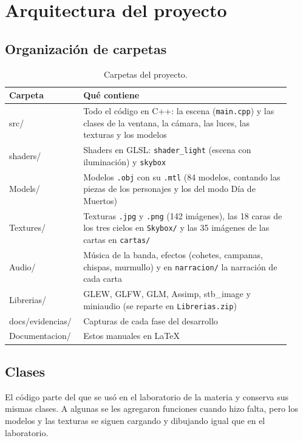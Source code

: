 \documentclass[11pt,a4paper]{article}
\begin{document}
\section{Arquitectura del proyecto}

\subsection{Organización de carpetas}

\begin{table}[H]
  \centering
  \small
  \begin{tabular}{|>{\ttfamily}p{0.22\linewidth}|p{0.7\linewidth}|}
    \hline
    \textbf{Carpeta} & \textbf{Qué contiene} \\ \hline
    src/ & Todo el código en C++: la escena (\texttt{main.cpp}) y las clases de la ventana, la cámara, las luces, las texturas y los modelos \\ \hline
    shaders/ & Shaders en GLSL: \texttt{shader\_light} (escena con iluminación) y \texttt{skybox} \\ \hline
    Models/ & Modelos \texttt{.obj} con su \texttt{.mtl} (84 modelos, contando las piezas de los personajes y los del modo Día de Muertos) \\ \hline
    Textures/ & Texturas \texttt{.jpg} y \texttt{.png} (142 imágenes), las 18 caras de los tres cielos en \texttt{Skybox/} y las 35 imágenes de las cartas en \texttt{cartas/} \\ \hline
    Audio/ & Música de la banda, efectos (cohetes, campanas, chispas, murmullo) y en \texttt{narracion/} la narración de cada carta \\ \hline
    Librerias/ & GLEW, GLFW, GLM, Assimp, stb\_image y miniaudio (se reparte en \texttt{Librerias.zip}) \\ \hline
    docs/evidencias/ & Capturas de cada fase del desarrollo \\ \hline
    Documentacion/ & Estos manuales en LaTeX \\ \hline
  \end{tabular}
  \caption{Carpetas del proyecto.}
\end{table}

\subsection{Clases}

El código parte del que se usó en el laboratorio de la materia y conserva sus mismas clases. A algunas se les agregaron funciones cuando hizo falta, pero los modelos y las texturas se siguen cargando y dibujando igual que en el laboratorio.
\end{document}
